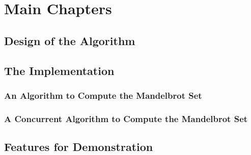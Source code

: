 \chapter{Main Chapters}
\section{Design of the Algorithm}

\section{The Implementation}

\subsection{An Algorithm to Compute the Mandelbrot Set}

\subsection{A Concurrent Algorithm to Compute the Mandelbrot Set}

\section{Features for Demonstration}

